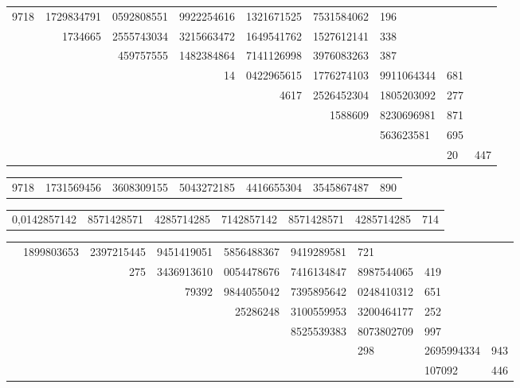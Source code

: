 \documentclass[10pt,a4paper]{article}
\begin{document}
\begin{center}
\begin{tabular}{r r r r r r}
9718 & 1729834791 & 0592808551 & 9922254616 & 1321671525 & 7531584062 & 196 \\
& 1734665 & 2555743034 & 3215663472 & 1649541762 & 1527612141 & 338 \\
& & 459757555 & 1482384864 & 7141126998 & 3976083263 & 387 \\
& & & 14 & 0422965615 & 1776274103 & 9911064344 & 681 \\
& & & & 4617 & 2526452304 & 1805203092 & 277 \\
& & & & & 1588609 & 8230696981 & 871 \\
& & & & & & 563623581 & 695 \\
& & & & & & & 20 & 447 \\
\end{tabular}
\end{center}

\medskip

\begin{center}
\begin{tabular}{r r r r r r}
9718 & 1731569456 & 3608309155 & 5043272185 & 4416655304 & 3545867487 & 890 \\
\end{tabular}
\end{center}

\medskip

\begin{center}
\begin{tabular}{r r r r r r}
0,0142857142 & 8571428571 & 4285714285 & 7142857142 & 8571428571 & 4285714285 & 714 \\
\end{tabular}
\end{center}

\medskip

\begin{center}
\begin{tabular}{r r r r r r}
& 1899803653 & 2397215445 & 9451419051 & 5856488367 & 9419289581 & 721 \\
& & 275 & 3436913610 & 0054478676 & 7416134847 & 8987544065 & 419 \\
& & & 79392 & 9844055042 & 7395895642 & 0248410312 & 651 \\
& & & & 25286248 & 3100559953 & 3200464177 & 252 \\
& & & & & 8525539383 & 8073802709 & 997 \\
& & & & & & 298 & 2695994334 & 943 \\
& & & & & & & 107092 & 446 \\
\end{tabular}
\end{center}
\end{document}
